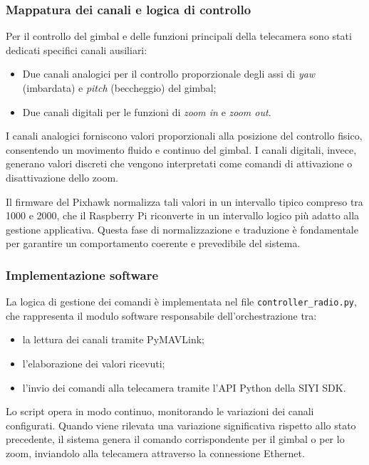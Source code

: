 \subsubsection{Mappatura dei canali e logica di controllo}

Per il controllo del gimbal e delle funzioni principali della telecamera sono stati dedicati specifici canali ausiliari:

\begin{itemize}
    \item Due canali analogici per il controllo proporzionale degli assi di \textit{yaw} (imbardata) e \textit{pitch} (beccheggio) del gimbal;
    \item Due canali digitali per le funzioni di \textit{zoom in} e \textit{zoom out}.
\end{itemize}

I canali analogici forniscono valori proporzionali alla posizione del controllo fisico, consentendo un movimento fluido e continuo del gimbal.  
I canali digitali, invece, generano valori discreti che vengono interpretati come comandi di attivazione o disattivazione dello zoom.

Il firmware del Pixhawk normalizza tali valori in un intervallo tipico compreso tra 1000 e 2000, che il Raspberry Pi riconverte in un intervallo logico più adatto alla gestione applicativa. Questa fase di normalizzazione e traduzione è fondamentale per garantire un comportamento coerente e prevedibile del sistema.

\subsubsection{Implementazione software}

La logica di gestione dei comandi è implementata nel file \texttt{controller\_radio.py}, che rappresenta il modulo software responsabile dell’orchestrazione tra:

\begin{itemize}
    \item la lettura dei canali tramite PyMAVLink;
    \item l’elaborazione dei valori ricevuti;
    \item l’invio dei comandi alla telecamera tramite l’API Python della SIYI SDK.
\end{itemize}

Lo script opera in modo continuo, monitorando le variazioni dei canali configurati.  
Quando viene rilevata una variazione significativa rispetto allo stato precedente, il sistema genera il comando corrispondente per il gimbal o per lo zoom, inviandolo alla telecamera attraverso la connessione Ethernet.

